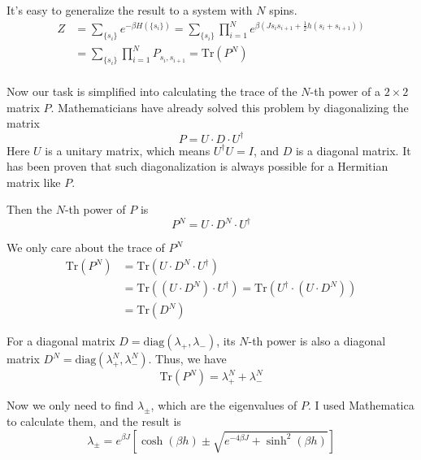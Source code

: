 \documentclass[11pt]{article}
\begin{document}
	It's easy to generalize the result to a system with $N$ spins.
	\begin{equation} \label{eq:PartitionFunction1DGeneral}
		\begin{aligned}
			Z &= \sum_{\{s_i\}} e^{-\beta H(\{s_i\})} = \sum_{\{s_i\}} \prod_{i=1}^{N} e^{\beta(J s_i s_{i+1} + \frac12h(s_i + s_{i+1}))} \\
			&= \sum_{\{s_i\}} \prod_{i=1}^{N} P_{s_i, s_{i+1}} = \mathrm{Tr}(P^N) \\
		\end{aligned}
	\end{equation}

	Now our task is simplified into calculating the trace of the $N$-th power of a $2 \times 2$ matrix $P$.
	Mathematicians have already solved this problem by diagonalizing the matrix
	\begin{equation} \label{eq:MatrixPDiagonal}
		P = U \cdot D \cdot U^\dagger
	\end{equation}
	Here $U$ is a unitary matrix, which means $U^\dagger U = I$, and $D$ is a diagonal matrix.
	It has been proven that such diagonalization is always possible for a Hermitian matrix like $P$.

	Then the $N$-th power of $P$ is
	\begin{equation} \label{eq:MatrixPN}
		P^N = U \cdot D^N \cdot U^\dagger
	\end{equation}

	We only care about the trace of $P^N$
	\begin{equation} \label{eq:MatrixPNTrace}
		\begin{aligned}
			\mathrm{Tr}(P^N) &= \mathrm{Tr}(U \cdot D^N \cdot U^\dagger) \\
			&= \mathrm{Tr}((U \cdot D^N) \cdot U^\dagger) = \mathrm{Tr}(U^\dagger \cdot (U \cdot D^N)) \\
			&= \mathrm{Tr}(D^N)
		\end{aligned}
	\end{equation}

	For a diagonal matrix $D = \mathrm{diag}(\lambda_+, \lambda_-)$, 
	its $N$-th power is also a diagonal matrix $D^N = \mathrm{diag}(\lambda_+^N, \lambda_-^N)$.
	Thus, we have
	\begin{equation} \label{eq:MatrixPNTraceDiagonal}
		\mathrm{Tr}(P^N) = \lambda_+^N + \lambda_-^N
	\end{equation}

	Now we only need to find $\lambda_\pm$, which are the eigenvalues of $P$.
	I used Mathematica to calculate them, and the result is
	\begin{equation} \label{eq:MatrixPEigenvalues}
		\lambda_\pm = e^{\beta J} \left[\cosh(\beta h) \pm \sqrt{e^{-4\beta J}+\sinh^2(\beta h)}\right]
	\end{equation}
\end{document}
